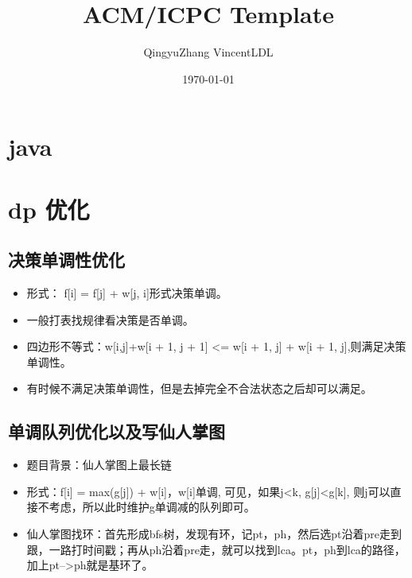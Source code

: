 \documentclass[landscape]{report}
\newcommand{\includecode}[2][c]{}
\begin{document}
 
\begin{flushleft}

\dominitoc[n]
\title{ACM/ICPC Template}
\author{QingyuZhang VincentLDL}
\date{\today}
\maketitle
\setcounter{secnumdepth}{3}
\tableofcontents
\newpage
\begin{multicols}{2}
\chapter{ java}
\includecode[java]{Main.java}
\chapter{ dp 优化}
\section{ 决策单调性优化}
\begin{itemize}
\item 形式： f[i] = f[j] + w[j, i]形式决策单调。
\item 一般打表找规律看决策是否单调。
\item 四边形不等式：w[i,j]+w[i + 1, j + 1] <= w[i + 1, j] + w[i + 1, j],则满足决策单调性。
\item 有时候不满足决策单调性，但是去掉完全不合法状态之后却可以满足。
\end{itemize}
 \includecode[c++]{hnoi2008toys.cpp}   

\section{ 单调队列优化以及写仙人掌图}
\begin{itemize}
\item 题目背景：仙人掌图上最长链
\item 形式：f[i] = max(g[j]) + w[i]，w[i]单调, 可见，如果j<k, g[j]<g[k], 则j可以直接不考虑，所以此时维护g单调减的队列即可。
\item 仙人掌图找环：首先形成bfs树，发现有环，记pt，ph，然后选pt沿着pre走到跟，一路打时间戳；再从ph沿着pre走，就可以找到lca。pt，ph到lca的路径，加上pt-->ph就是基环了。
\end{itemize}
\includecode[c++]{ioi2008Island.cpp}

\end{multicols}
\end{flushleft}
\end{document}
